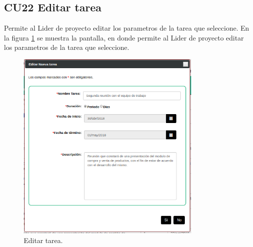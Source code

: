\subsection{CU22 Editar tarea}
{
\justify
{}
}

\justify
Permite al Lider de proyecto editar los parametros de la tarea que seleccione.
{
\justify
{}
}
\justify
En la figura \ref{fig:IU22} se muestra la pantalla, en donde permite al Lider de proyecto editar los parametros de la tarea que seleccione.

\begin{figure}[htb]
\centering
\includegraphics[width=0.8\textwidth]{./images/cu22-editar-tarea.png}
\caption{Editar tarea.} \label{fig:IU22}
\end{figure}